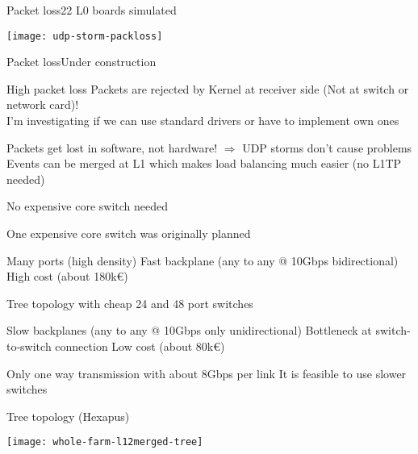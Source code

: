 \begin{frame}{Packet loss}{22 L0 boards simulated}
	\begin{center} 
		\texttt{[image: udp-storm-packloss]}
	\end{center} 
\end{frame}

\begin{frame}{Packet loss}{Under construction}
	\begin{block}{High packet loss}
		Packets are rejected by Kernel at receiver side (Not at switch or network
		card)!
		\\
		I'm investigating if we can use standard drivers or have to implement own
		ones
	\end{block}
	
	\begin{exampleblock}{Packets get lost in software, not hardware!}
		$\Rightarrow$ UDP storms don't cause problems \\
		
		Events can be merged at L1 which makes load balancing much easier (no L1TP
		needed)
	\end{exampleblock}
\end{frame}

\begin{frame}{No expensive core switch needed}{}
	\begin{block}{One expensive core switch was originally planned}
		\begin{itemize}
		  \pro Many ports (high density)
		  \pro Fast backplane (any to any @ 10Gbps bidirectional)
		  \contra High cost (about 180k€)
		\end{itemize}
	\end{block}
	\begin{block}{Tree topology with cheap 24 and 48 port switches}
		\begin{itemize}
		  \contra Slow backplanes (any to any @ 10Gbps only unidirectional)
		  \contra Bottleneck at switch-to-switch connection
		  \pro Low cost (about 80k€)
		\end{itemize}
	\end{block}
	\begin{exampleblock}{Only one way transmission with about 8Gbps per link}
		It is feasible to use slower switches
	\end{exampleblock}
\end{frame}

\begin{frame}{Tree topology (Hexapus)}{}
	\begin{center} 
		\texttt{[image: whole-farm-l12merged-tree]}
	\end{center} 
\end{frame}
